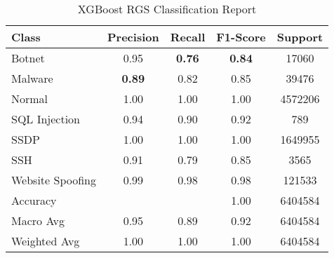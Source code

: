 \begin{table}[htbp]
  \centering
  \caption{XGBoost RGS Classification Report}
  \label{tab:optimised_xgboost}
    \begin{tabular}{lcccc}
    \toprule
    Class & Precision & Recall & F1-Score & Support \\
    \midrule
    Botnet & 0.95 & {\color{red}\bfseries 0.76} & {\color{red}\bfseries 0.84} & 17060 \\
    Malware & {\color{red}\bfseries 0.89} & 0.82 & 0.85 & 39476 \\
    Normal & 1.00 & 1.00 & 1.00 & 4572206 \\
    SQL Injection & 0.94 & 0.90 & 0.92 & 789 \\
    SSDP & 1.00 & 1.00 & 1.00 & 1649955 \\
    SSH & 0.91 & 0.79 & 0.85 & 3565 \\
    Website Spoofing & 0.99 & 0.98 & 0.98 & 121533 \\
    \midrule
    Accuracy & & & 1.00 & 6404584 \\
    Macro Avg & 0.95 & 0.89 & 0.92 & 6404584 \\
    Weighted Avg & 1.00 & 1.00 & 1.00 & 6404584 \\
    \bottomrule
    \end{tabular}%
\end{table}%



